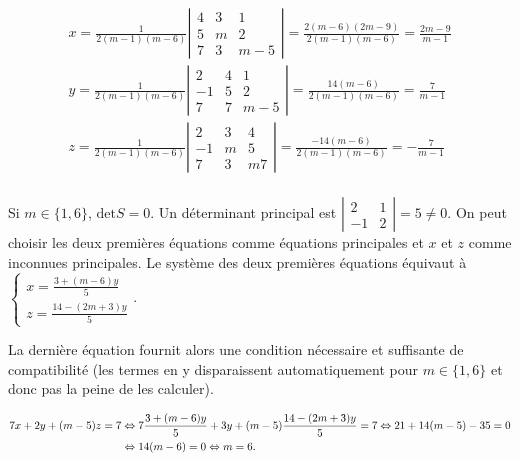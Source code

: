 {{$$\begin{array}{l}
x=\frac{1}{2(m-1)(m-6)}\left|
\begin{array}{ccc}
4&3&1\\
5&m&2\\
7&3&m-5
\end{array}
\right|
=\frac{2(m-6)(2m-9)}{2(m-1)(m-6)}=\frac{2m-9}{m-1}\\
y=\frac{1}{2(m-1)(m-6)}\left|
\begin{array}{ccc}
2&4&1\\
-1&5&2\\
7&7&m-5
\end{array}
\right|
=\frac{14(m-6)}{2(m-1)(m-6)}=\frac{7}{m-1}\\
z=\frac{1}{2(m-1)(m-6)}\left|
\begin{array}{ccc}
2&3&4\\
-1&m&5\\
7&3&m7
\end{array}
\right|  =\frac{-14(m-6)}{2(m-1)(m-6)}=-\frac{7}{m-1}\\
\end{array}
$$

Si $m\in\{1,6\}$, $\mbox{det}S=0$. Un déterminant principal est $\left|
\begin{array}{cc}
2&1\\
-1&2
\end{array}
\right|=5\neq0$. On peut choisir les deux premières équations comme équations principales et $x$ et $z$ comme inconnues principales. Le système des deux premières équations équivaut à $\left\{
\begin{array}{l}
x=\frac{3+(m-6)y}{5}\\
z=\frac{14-(2m+3)y}{5}
\end{array}
\right.$.

La dernière équation fournit alors une condition nécessaire et suffisante de compatibilité (les termes en y disparaissent automatiquement pour $m\in\{1,6\}$ et donc pas la peine de les calculer).

\begin{align*}\ensuremath
7x+2y+(m-5)z=7&\Leftrightarrow7\frac{3+(m-6)y}{5}+3y+(m-5)\frac{14-(2m+3)y}{5}=7\Leftrightarrow 21+14(m-5)-35=0\\
 &\Leftrightarrow 14(m-6)= 0\Leftrightarrow m = 6.
\end{align*}

}}
